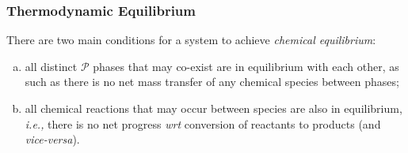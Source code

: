 \documentclass[12pts,a4paper,amsmath,amssymb,floatfix]{article}%
\newcommand{\ie}{{\it i.e., }}
\newcommand{\wrt}{{\it wrt }}
\begin{document}
\subsubsection{Thermodynamic Equilibrium}\label{Section:04:thermodynamicEquilibrium}

There are two main conditions for a system to achieve {\it chemical equilibrium}:
  \begin{enumerate}[a)]
     \item all distinct $\mathcal{P}$ phases that may co-exist are in equilibrium with each other, as such as there is no net mass transfer of any chemical species between phases;
     \item all chemical reactions that may occur between species are also in equilibrium, \ie there is no net progress \wrt conversion of reactants to products (and {\it vice-versa}).
  \end{enumerate}
\end{document}
